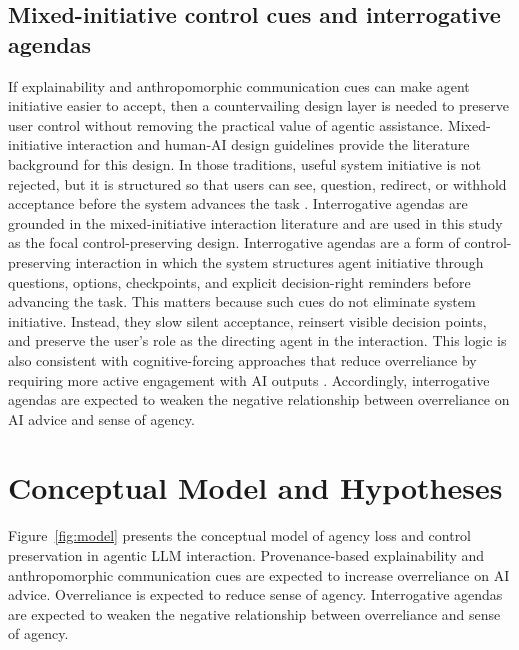\documentclass[sigconf,review,anonymous]{acmart}
\begin{document}
\subsection{Mixed-initiative control cues and interrogative agendas}

If explainability and anthropomorphic communication cues can make agent initiative easier to accept, then a countervailing design layer is needed to preserve user control without removing the practical value of agentic assistance. Mixed-initiative interaction and human-AI design guidelines provide the literature background for this design. In those traditions, useful system initiative is not rejected, but it is structured so that users can see, question, redirect, or withhold acceptance before the system advances the task \cite{horvitz1999principles,amershi2019guidelines}. Interrogative agendas are grounded in the mixed-initiative interaction literature and are used in this study as the focal control-preserving design. Interrogative agendas are a form of control-preserving interaction in which the system structures agent initiative through questions, options, checkpoints, and explicit decision-right reminders before advancing the task. This matters because such cues do not eliminate system initiative. Instead, they slow silent acceptance, reinsert visible decision points, and preserve the user’s role as the directing agent in the interaction. This logic is also consistent with cognitive-forcing approaches that reduce overreliance by requiring more active engagement with AI outputs \cite{bucinca2021trust}. Accordingly, interrogative agendas are expected to weaken the negative relationship between overreliance on AI advice and sense of agency.

\section{Conceptual Model and Hypotheses}

Figure~\ref{fig:model} presents the conceptual model of agency loss and control preservation in agentic LLM interaction. Provenance-based explainability and anthropomorphic communication cues are expected to increase overreliance on AI advice. Overreliance is expected to reduce sense of agency. Interrogative agendas are expected to weaken the negative relationship between overreliance and sense of agency.
\end{document}
